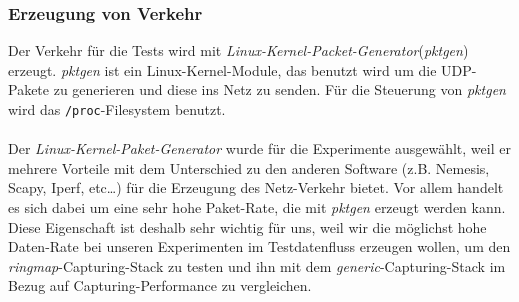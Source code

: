 \subsubsection{Erzeugung von Verkehr}
Der Verkehr für die Tests wird mit
\emph{Linux-Kernel-Packet-Generator}(\emph{pktgen})~\cite{linux_pktgen} erzeugt.
\emph{pktgen} ist ein Linux-Kernel-Module, das benutzt wird um die UDP-Pakete
zu generieren und diese ins Netz zu senden. Für die Steuerung von \emph{pktgen}
wird das \verb+/proc+-Filesystem benutzt.\\\\
Der \emph{Linux-Kernel-Paket-Generator} wurde für die Experimente ausgewählt,
weil er mehrere Vorteile mit dem Unterschied zu den anderen Software (z.B.
Nemesis, Scapy, Iperf, etc\ldots) für die Erzeugung des Netz-Verkehr bietet. Vor
allem handelt es sich dabei um eine sehr hohe Paket-Rate, die mit \emph{pktgen}
erzeugt werden kann. Diese Eigenschaft ist deshalb sehr wichtig für uns, weil
wir die möglichst hohe Daten-Rate bei unseren Experimenten im Testdatenfluss
erzeugen wollen, um den \emph{ringmap}-Capturing-Stack zu testen und ihn mit
dem \emph{generic}-Capturing-Stack im Bezug auf Capturing-Performance zu
vergleichen.
%
%
